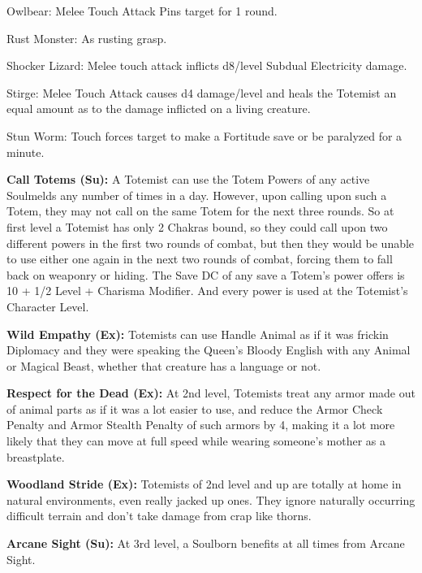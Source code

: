 \begin{itemize*}
\item Owlbear: Melee Touch Attack Pins target for 1 round. 
\item Rust Monster: As rusting grasp. 
\item Shocker Lizard: Melee touch attack inflicts d8/level Subdual Electricity damage. 
\item Stirge: Melee Touch Attack causes d4 damage/level and heals the Totemist an equal amount as to the damage inflicted on a living creature. 
\item Stun Worm: Touch forces target to make a Fortitude save or be paralyzed for a minute. 
\end{itemize*}

\textbf{Call Totems (Su):} A Totemist can use the Totem Powers of any active Soulmelds any number of times in a day. However, upon calling upon such a Totem, they may not call on the same Totem for the next three rounds. So at first level a Totemist has only 2 Chakras bound, so they could call upon two different powers in the first two rounds of combat, but then they would be unable to use either one again in the next two rounds of combat, forcing them to fall back on weaponry or hiding. The Save DC of any save a Totem's power offers is 10 + 1/2 Level + Charisma Modifier. And every power is used at the Totemist's Character Level. 

\textbf{Wild Empathy (Ex):} Totemists can use Handle Animal as if it was frickin Diplomacy and they were speaking the Queen's Bloody English with any Animal or Magical Beast, whether that creature has a language or not. 

\textbf{Respect for the Dead (Ex):} At 2nd level, Totemists treat any armor made out of animal parts as if it was a lot easier to use, and reduce the Armor Check Penalty and Armor Stealth Penalty of such armors by 4, making it a lot more likely that they can move at full speed while wearing someone's mother as a breastplate. 

\textbf{Woodland Stride (Ex):} Totemists of 2nd level and up are totally at home in natural environments, even really jacked up ones. They ignore naturally occurring difficult terrain and don't take damage from crap like thorns. 

\textbf{Arcane Sight (Su):} At 3rd level, a Soulborn benefits at all times from Arcane Sight. 

